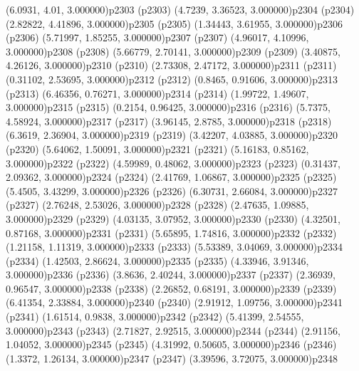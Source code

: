 \psPoint(6.0931, 4.01, 3.000000){p2303}
\psdot(p2303)
\psPoint(4.7239, 3.36523, 3.000000){p2304}
\psdot(p2304)
\psPoint(2.82822, 4.41896, 3.000000){p2305}
\psdot(p2305)
\psPoint(1.34443, 3.61955, 3.000000){p2306}
\psdot(p2306)
\psPoint(5.71997, 1.85255, 3.000000){p2307}
\psdot(p2307)
\psPoint(4.96017, 4.10996, 3.000000){p2308}
\psdot(p2308)
\psPoint(5.66779, 2.70141, 3.000000){p2309}
\psdot(p2309)
\psPoint(3.40875, 4.26126, 3.000000){p2310}
\psdot(p2310)
\psPoint(2.73308, 2.47172, 3.000000){p2311}
\psdot(p2311)
\psPoint(0.31102, 2.53695, 3.000000){p2312}
\psdot(p2312)
\psPoint(0.8465, 0.91606, 3.000000){p2313}
\psdot(p2313)
\psPoint(6.46356, 0.76271, 3.000000){p2314}
\psdot(p2314)
\psPoint(1.99722, 1.49607, 3.000000){p2315}
\psdot(p2315)
\psPoint(0.2154, 0.96425, 3.000000){p2316}
\psdot(p2316)
\psPoint(5.7375, 4.58924, 3.000000){p2317}
\psdot(p2317)
\psPoint(3.96145, 2.8785, 3.000000){p2318}
\psdot(p2318)
\psPoint(6.3619, 2.36904, 3.000000){p2319}
\psdot(p2319)
\psPoint(3.42207, 4.03885, 3.000000){p2320}
\psdot(p2320)
\psPoint(5.64062, 1.50091, 3.000000){p2321}
\psdot(p2321)
\psPoint(5.16183, 0.85162, 3.000000){p2322}
\psdot(p2322)
\psPoint(4.59989, 0.48062, 3.000000){p2323}
\psdot(p2323)
\psPoint(0.31437, 2.09362, 3.000000){p2324}
\psdot(p2324)
\psPoint(2.41769, 1.06867, 3.000000){p2325}
\psdot(p2325)
\psPoint(5.4505, 3.43299, 3.000000){p2326}
\psdot(p2326)
\psPoint(6.30731, 2.66084, 3.000000){p2327}
\psdot(p2327)
\psPoint(2.76248, 2.53026, 3.000000){p2328}
\psdot(p2328)
\psPoint(2.47635, 1.09885, 3.000000){p2329}
\psdot(p2329)
\psPoint(4.03135, 3.07952, 3.000000){p2330}
\psdot(p2330)
\psPoint(4.32501, 0.87168, 3.000000){p2331}
\psdot(p2331)
\psPoint(5.65895, 1.74816, 3.000000){p2332}
\psdot(p2332)
\psPoint(1.21158, 1.11319, 3.000000){p2333}
\psdot(p2333)
\psPoint(5.53389, 3.04069, 3.000000){p2334}
\psdot(p2334)
\psPoint(1.42503, 2.86624, 3.000000){p2335}
\psdot(p2335)
\psPoint(4.33946, 3.91346, 3.000000){p2336}
\psdot(p2336)
\psPoint(3.8636, 2.40244, 3.000000){p2337}
\psdot(p2337)
\psPoint(2.36939, 0.96547, 3.000000){p2338}
\psdot(p2338)
\psPoint(2.26852, 0.68191, 3.000000){p2339}
\psdot(p2339)
\psPoint(6.41354, 2.33884, 3.000000){p2340}
\psdot(p2340)
\psPoint(2.91912, 1.09756, 3.000000){p2341}
\psdot(p2341)
\psPoint(1.61514, 0.9838, 3.000000){p2342}
\psdot(p2342)
\psPoint(5.41399, 2.54555, 3.000000){p2343}
\psdot(p2343)
\psPoint(2.71827, 2.92515, 3.000000){p2344}
\psdot(p2344)
\psPoint(2.91156, 1.04052, 3.000000){p2345}
\psdot(p2345)
\psPoint(4.31992, 0.50605, 3.000000){p2346}
\psdot(p2346)
\psPoint(1.3372, 1.26134, 3.000000){p2347}
\psdot(p2347)
\psPoint(3.39596, 3.72075, 3.000000){p2348}
